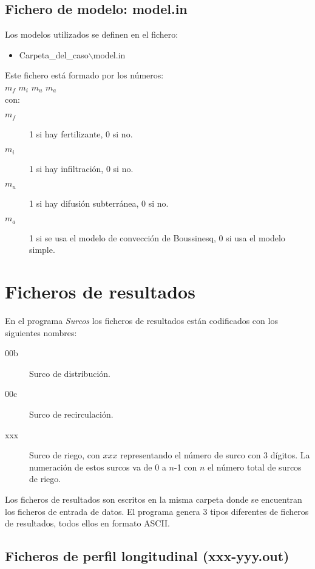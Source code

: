 \subsection{Fichero de modelo: model.in}

Los modelos utilizados se definen en el fichero:
\begin{itemize}
\item Carpeta\_del\_caso$\backslash$model.in
\end{itemize}

Este fichero está formado por los números:\\
$m_f$ $m_i$ $m_u$ $m_a$\\
con:
\begin{description}
\item[$m_f$] 1 si hay fertilizante, 0 si no.
\item[$m_i$] 1 si hay infiltración, 0 si no.
\item[$m_u$] 1 si hay difusión subterránea, 0 si no.
\item[$m_a$] 1 si se usa el modelo de convección de Boussinesq, 0 si usa el
	modelo simple.
\end{description}

\section{Ficheros de resultados}

En el programa \emph{Surcos} los ficheros de resultados están codificados con
los siguientes nombres:
\begin{description}
\item[00b] Surco de distribución.
\item[00c] Surco de recirculación.
\item[xxx] Surco de riego, con $xxx$ representando el número de surco con 3
	dígitos. La numeración de estos surcos va de 0 a $n$-1 con $n$ el
	número total de surcos de riego.
\end{description}

Los ficheros de resultados son escritos en la misma carpeta donde se
encuentran los ficheros de entrada de datos. El programa genera 3 tipos
diferentes de ficheros de resultados, todos ellos en formato ASCII. 

\subsection{Ficheros de perfil longitudinal (xxx-yyy.out)}

